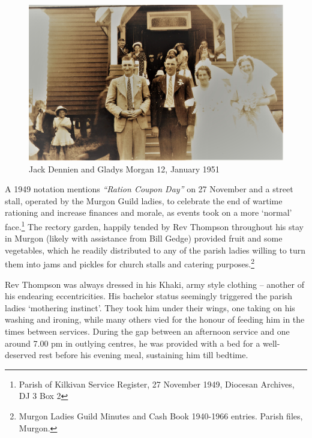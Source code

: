 \begin{figure}[!htb]
\begin{center}
\includegraphics[width=1.\textwidth,center]{../images/JackDennienGladysMorgan12Jan1951.jpg}
\caption{Jack Dennien and Gladys Morgan 12, January 1951}
\end{center}
\end{figure}




A 1949 notation mentions \emph{``Ration Coupon Day''} on 27 November and a street stall, operated by the Murgon Guild ladies, to celebrate the end of wartime rationing and increase finances and morale, as events took on a more `normal' face.\footnote{Parish of Kilkivan Service Register, 27 November 1949, Diocesan Archives, DJ 3 Box 2} The rectory garden, happily tended by Rev Thompson throughout his stay in Murgon (likely with assistance from Bill Gedge) provided fruit and some vegetables, which he readily distributed to any of the parish ladies willing to turn them into jams and pickles for church stalls and catering purposes.\footnote{Murgon Ladies Guild Minutes and Cash Book 1940-1966 entries. Parish files, Murgon.}


Rev Thompson was always dressed in his Khaki, army style clothing -- another of his endearing eccentricities. His bachelor status seemingly triggered the parish ladies `mothering instinct'. They took him under their wings, one taking on his washing and ironing, while many others vied for the honour of feeding him in the times between services. During the gap between an afternoon service and one around 7.00 pm in outlying centres, he was provided with a bed for a well-deserved rest before his evening meal, sustaining him till bedtime.



